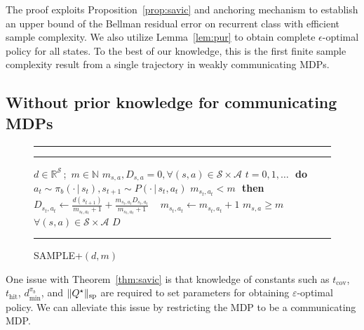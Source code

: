 \documentclass{article}
\theoremstyle{definition}
\theoremstyle{remark}
\newcommand{\real}{\mathbb{R}}
\newcommand{\cA}{\mathcal{A}}
\newcommand{\cS}{\mathcal{S}}
\renewcommand{\sp}[1]{\|{#1}\|_\text{\rm sp}}
\begin{document}
The proof exploits Proposition~\ref{prop:savic} and anchoring mechanism to establish an upper bound of the Bellman residual
error on recurrent class with efficient sample complexity. We also  utilize Lemma~\ref{lem:pur} to obtain complete $\epsilon$-optimal policy for all states. To the best of our knowledge, this is the first finite sample complexity result from a single trajectory in weakly communicating MDPs.

\subsection{Without prior knowledge for communicating MDPs}
\label{others}


\begin{figure}
\vspace{-.14in}
\captionsetup{type=algorithm}
\hrule
\vspace{2pt}
\begin{minipage}{0.44\textwidth}
 \caption{\mbox{\sc SAMPLE+}$(d, m)$}
   \label{alg:sam_2}
\vspace{-.1in}
\hrule
\begin{algorithmic}
   $d \in \real^{\cS}$\,;\, $m \in \mathbb{N}$
   $m_{s,a}, D_{s,a} \!=\!0,\! \forall (s,a) \!\in\! \cS \!\times \!\cA $
    $t=0,1,\dots$ \,\,\textbf{do}
     \State \quad\,\,\, $a_{t} \sim \pi_b(\cdot \,|\, s_{t}), s_{t+1} \sim P(\cdot \,|\, s_t,a_t)$
      $m_{s_t,a_t} <m$ \,\,\textbf{then} 
   \State  \quad\,\,\qquad $D_{s_t,a_t}\! \gets \! \frac{d(s_{t+1})}{m_{s_t,a_t}+1} + \frac{m_{s_t,a_t}D_{s_t,a_t}}{m_{s_t,a_t}+1}$
     \State \quad\,\,\, $m_{s_t,a_t} \gets m_{s_t,a_t}+1$
    $m_{s,a} \ge  m$ $ \forall  (s,a) \in \cS \times \cA $
  $D$
\end{algorithmic}
\hrule
\end{minipage}
\vspace{-.3in}
\end{figure}



One issue with Theorem~\ref{thm:savic} is that knowledge of constants such as $t_{\mathrm{cov}}$, $t_{\mathrm{hit}}$, $d^{\pi_b}_{\mathrm{min}}$, and $\sp{Q^\star}$ are required to set parameters for obtaining $\varepsilon$-optimal policy. We can alleviate this issue by restricting the MDP to be a communicating MDP.
\end{document}
